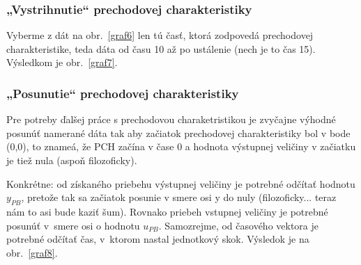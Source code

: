 \documentclass[a4paper, 10pt, ]{article}
\begin{document}
\subsubsection{„Vystrihnutie“ prechodovej charakteristiky}

Vyberme z dát na obr.~\ref{graf6} len tú časť, ktorá zodpovedá prechodovej charakteristike, teda dáta od času 10 až po ustálenie (nech je to čas 15). Výsledkom je obr.~\ref{graf7}.





\subsubsection{„Posunutie“ prechodovej charakteristiky}



Pre potreby ďalšej práce s prechodovou charaketristikou je zvyčajne výhodné posunúť namerané dáta tak aby začiatok prechodovej charakteristiky bol v bode (0,0), to znameá, že PCH začína v  čase 0 a hodnota výstupnej veličiny v začiatku je tiež nula (aspoň filozoficky).


Konkrétne: od získaného priebehu výstupnej veličiny je potrebné odčítať hodnotu $y_{PB}$, pretože tak sa začiatok posunie v smere osi y do nuly (filozoficky... teraz nám to asi bude kaziť šum). Rovnako priebeh vstupnej veličiny je potrebné posunúť v~smere osi o hodnotu $u_{PB}$. Samozrejme, od časového vektora je potrebné odčítať čas, v~ktorom nastal jednotkový skok. Výsledok je na obr.~\ref{graf8}.
\end{document}
